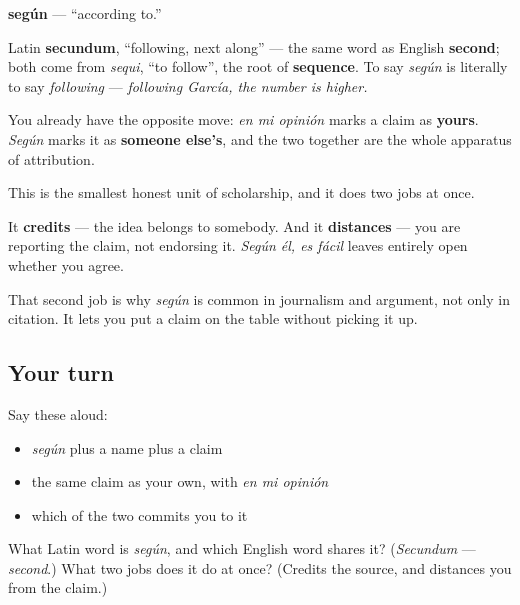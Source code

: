 \begin{cousinweb}
\textbf{según} — \textquotedblleft{}according to.\textquotedblright{}

Latin \textbf{secundum}, \textquotedblleft{}following, next along\textquotedblright{} — the same word as English \textbf{second}; both come from \emph{sequi}, \textquotedblleft{}to follow\textquotedblright{}, the root of \textbf{sequence}. To say \emph{según} is literally to say \emph{following} — \emph{following García, the number is higher.}

You already have the opposite move: \emph{en mi opinión} marks a claim as \textbf{yours}. \emph{Según} marks it as \textbf{someone else's}, and the two together are the whole apparatus of attribution.
\end{cousinweb}

\begin{grammarlens}[title={What you've built}]
This is the smallest honest unit of scholarship, and it does two jobs at once.

It \textbf{credits} — the idea belongs to somebody. And it \textbf{distances} — you are reporting the claim, not endorsing it. \emph{Según él, es fácil} leaves entirely open whether you agree.

That second job is why \emph{según} is common in journalism and argument, not only in citation. It lets you put a claim on the table without picking it up.
\end{grammarlens}

\subsection*{Your turn}
Say these aloud:

\begin{itemize}
\raggedright
  \item \emph{según} plus a name plus a claim
  \item the same claim as your own, with \emph{en mi opinión}
  \item which of the two commits you to it
\end{itemize}

\begin{tcolorbox}[breakable,colback=teal!4,colframe=teal!35!black,title={Before you move on}]
What Latin word is \emph{según}, and which English word shares it? (\emph{Secundum} — \emph{second}.) What two jobs does it do at once? (Credits the source, and distances you from the claim.)
\end{tcolorbox}
